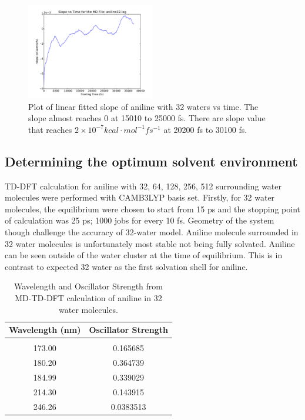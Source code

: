 \documentclass[
journal=jpcbfk, %
manuscript=article]{achemso}
\begin{document}
\begin{figure}[!htb]
	\centering		
	\includegraphics[width=0.5\textwidth]{CAMB3LYP/aniline32_log_SlopePlot.pdf}
	\caption{Plot of linear fitted slope of aniline with 32 waters vs time. The slope almost reaches 0 at 15010 to 25000 fs. There are slope value that reaches \(2\times 10^{-7} kcal\cdot mol^{-1}fs^{-1}\) at 20200 fs to 30100 fs.}
	\label{fig:aniline32SlopePlot}
\end{figure}


\subsection{Determining the optimum solvent environment}
TD-DFT calculation for aniline with 32, 64, 128, 256, 512 surrounding water molecules were performed with CAMB3LYP basis set. Firstly, for 32 water molecules, the equilibrium were chosen to start from 15 ps and the stopping point of calculation was 25 ps; 1000 jobs for every 10 fs.  Geometry of the system though challenge the accuracy of 32-water model. Aniline molecule surrounded in 32 water molecules is unfortunately most stable not being fully solvated. Aniline can be seen outside of the water cluster at the time of equilibrium. This is in contrast to expected 32 water as the first solvation shell for aniline. \cite{Plugatyr2009} 



\begin{table}[ht]
	\caption{Wavelength and Oscillator Strength from MD-TD-DFT calculation of aniline in 32 water molecules.}
	\label{table:aniline32TD-DFTTable}
	\centering
	\begin{tabular}{c c}
		Wavelength (nm) & Oscillator Strength\\ [1ex] %
		\hline\hline
		\\[-0.5ex]
		173.00&0.165685\\
		180.20&0.364739 \\
		184.99&0.339029\\
		214.30&0.143915\\
		246.26&0.0383513\\ [1ex]
	\end{tabular}
\end{table}
\end{document}
